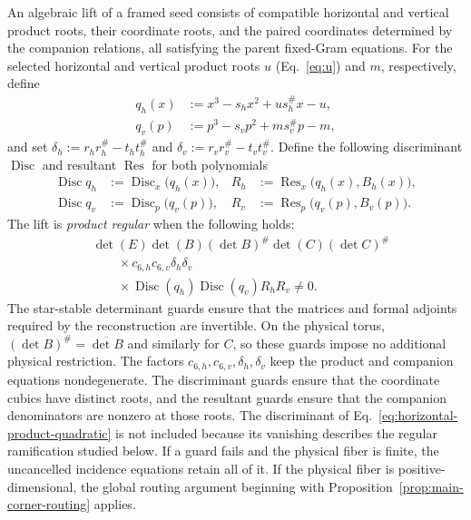 \begin{definition}
\label{def:product-regularity}
An algebraic lift of a framed seed consists of compatible horizontal and vertical product roots, their coordinate roots, and the paired coordinates determined by the companion relations, all satisfying the parent fixed-Gram equations. For the selected horizontal and vertical product roots $u$ (Eq.~\ref{eq:u}) and $m$, respectively, define
\begin{equation}
\begin{aligned}
q_h(x)&:=x^3-s_hx^2+us_h^\#x-u,\\
q_v(p)&:=p^3-s_vp^2+ms_v^\#p-m,
\end{aligned}
\end{equation}
and set $\delta_h:=r_hr_h^\#-t_ht_h^\#$ and $\delta_v:=r_vr_v^\#-t_vt_v^\#$. Define the following discriminant $\operatorname{Disc}$ and resultant $\operatorname{Res}$ for both polynomials
\begin{equation}
\begin{aligned}
\operatorname{Disc}q_h&:=\operatorname{Disc}_x\bigl(q_h(x)\bigr),&
R_h&:=\operatorname{Res}_x\bigl(q_h(x),B_h(x)\bigr),\\
\operatorname{Disc}q_v&:=\operatorname{Disc}_p\bigl(q_v(p)\bigr),&
R_v&:=\operatorname{Res}_p\bigl(q_v(p),B_v(p)\bigr).
\end{aligned}
\label{eq:product-regularity-auxiliary-guards}
\end{equation}
The lift is \emph{product regular} when the following holds:
\begin{equation}
\begin{aligned}
&\det(E)\det(B)(\det B)^\#\det(C)(\det C)^\#\\
&\qquad{}\times c_{6,h}c_{6,v}\delta_h\delta_v\\
&\qquad{}\times\operatorname{Disc}(q_h)\operatorname{Disc}(q_v)R_hR_v\neq0.
\end{aligned}
\label{eq:product-regularity-guards}
\end{equation}
The star-stable determinant guards ensure that the matrices and formal adjoints required by the reconstruction are invertible. On the physical torus, $(\det B)^\#=\overline{\det B}$ and similarly for $C$, so these guards impose no additional physical restriction. The factors $c_{6,h},c_{6,v},\delta_h,\delta_v$ keep the product and companion equations nondegenerate. The discriminant guards ensure that the coordinate cubics have distinct roots, and the resultant guards ensure that the companion denominators are nonzero at those roots. 
The discriminant of Eq.~\ref{eq:horizontal-product-quadratic} is not included because its vanishing describes the regular ramification studied below. 
If a guard fails and the physical fiber is finite, the uncancelled incidence equations retain all of it. If the physical fiber is positive-dimensional, the global routing argument beginning with Proposition~\ref{prop:main-corner-routing} applies.
\end{definition}


